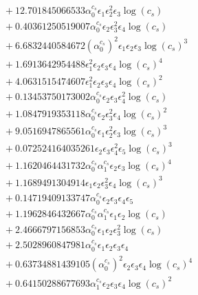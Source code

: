 \documentclass[10pt]{article}
\begin{document}
\begin{align*}
&{}  + 12.701845066533 \alpha_{0}^{c_s} \epsilon_{1} \epsilon_{2}^{2} \epsilon_{3} \log{\left(c_{s} \right)} \\
&{}  + 0.40361250519007 \alpha_{0}^{c_s} \epsilon_{2} \epsilon_{3}^{2} \epsilon_{4} \log{\left(c_{s} \right)} \\
&{}  + 6.6832440584672 \left(\alpha_{0}^{c_s}\right)^{2} \epsilon_{1} \epsilon_{2} \epsilon_{3} \log{\left(c_{s} \right)}^{3} \\
&{}  + 1.6913642954488 \epsilon_{1}^{2} \epsilon_{2} \epsilon_{3} \epsilon_{4} \log{\left(c_{s} \right)}^{4} \\
&{}  + 4.0631515474607 \epsilon_{1}^{2} \epsilon_{2} \epsilon_{3} \epsilon_{4} \log{\left(c_{s} \right)}^{2} \\
&{}  + 0.13453750173002 \alpha_{0}^{c_s} \epsilon_{2} \epsilon_{3} \epsilon_{4}^{2} \log{\left(c_{s} \right)} \\
&{}  + 1.0847919353118 \alpha_{0}^{c_s} \epsilon_{2} \epsilon_{3}^{2} \epsilon_{4} \log{\left(c_{s} \right)}^{2} \\
&{}  + 9.0516947865561 \alpha_{0}^{c_s} \epsilon_{1} \epsilon_{2}^{2} \epsilon_{3} \log{\left(c_{s} \right)}^{3} \\
&{}  + 0.072524164035261 \epsilon_{2} \epsilon_{3} \epsilon_{4}^{2} \epsilon_{5} \log{\left(c_{s} \right)}^{3} \\
&{}  + 1.1620464431732 \alpha_{0}^{c_s} \alpha_{1}^{c_s} \epsilon_{2} \epsilon_{3} \log{\left(c_{s} \right)}^{4} \\
&{}  + 1.1689491304914 \epsilon_{1} \epsilon_{2} \epsilon_{3}^{2} \epsilon_{4} \log{\left(c_{s} \right)}^{3} \\
&{}  + 0.14719409133747 \alpha_{0}^{c_s} \epsilon_{2} \epsilon_{3} \epsilon_{4} \epsilon_{5} \\
&{}  + 1.1962846432667 \alpha_{0}^{c_s} \alpha_{1}^{c_s} \epsilon_{1} \epsilon_{2} \log{\left(c_{s} \right)} \\
&{}  + 2.4666797156853 \alpha_{0}^{c_s} \epsilon_{1} \epsilon_{2} \epsilon_{3}^{2} \log{\left(c_{s} \right)} \\
&{}  + 2.5028960847981 \alpha_{0}^{c_s} \epsilon_{1} \epsilon_{2} \epsilon_{3} \epsilon_{4} \\
&{}  + 0.63734881439105 \left(\alpha_{0}^{c_s}\right)^{2} \epsilon_{2} \epsilon_{3} \epsilon_{4} \log{\left(c_{s} \right)}^{4} \\
&{}  + 0.64150288677693 \alpha_{1}^{c_s} \epsilon_{2} \epsilon_{3} \epsilon_{4} \log{\left(c_{s} \right)}^{2} \\

\end{align*}
\end{document}
